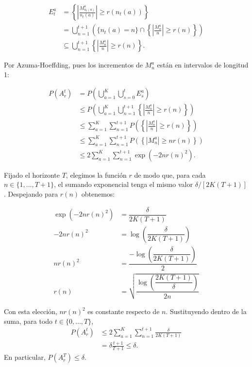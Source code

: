 \begin{align*}
E_t^a &=\left\{\left|\frac{M^a_{n_t(a)}}{n_t(a)}\right|\ge r(n_t(a))\right\}\\
     &= \bigcup_{n=1}^{t+1}\left(\{n_t(a)=n\}\cap\left\{\left|\frac{M_n^a}{n}\right|\ge r(n)\right\}\right)\\
     &\subseteq\bigcup_{n=1}^{t+1}\left\{\left|\frac{M_n^a}{n}\right|\ge r(n)\right\}.
\end{align*}

Por Azuma-Hoeffding, pues los incrementos de \(M_n^a\) están en intervalos de longitud 1:

\begin{align}
    P(A_r^t) &= P\left(\bigcup^K_{a=1}\bigcup^t_{s=0} E^a_s\right) \nonumber \\
             &\leq P\left( \bigcup^K_{a=1}\bigcup^{t+1}_{n=1} \left\{\left|\frac{M_n^a}{n}\right|\ge r(n)\right\}\right) \nonumber \\
             & \leq \sum^K_{a=1} \sum^{t+1}_{n=1} P\left( \left\{\left|\frac{M_n^a}{n}\right|\ge r(n)\right\}\right) \nonumber\\
             & \leq \sum^K_{a=1} \sum^{t+1}_{n=1} P\left( \left\{\left|M_n^a\right|\ge nr(n)\right\}\right) \nonumber\\
                &\leq 2\sum^K_{a=1}\sum^{t+1}_{n=1}\operatorname{exp}(-2nr(n)^2).
\end{align}

Fijado el horizonte \(T\), elegimos la función \(r\) de modo que, para cada \(n\in\{1,\ldots,T+1\}\), el sumando exponencial tenga el mismo valor \(\delta/[2K(T+1)]\). Despejando para \(r(n)\) obtenemos:

\begin{align}
    \operatorname{exp}(-2nr(n)^2) &= \dfrac{\delta}{2K(T+1)}  \nonumber \\
    -2nr(n)^2  &= \operatorname{log}\left(\dfrac{\delta}{2K(T+1)}\right) \nonumber \\
    nr(n)^2 &=  \dfrac{-\operatorname{log}\left(\dfrac{\delta}{2K(T+1)}\right)}{2} \nonumber \\
    r(n) &=  \sqrt{\dfrac{\operatorname{log}\left(\dfrac{2K(T+1)}{\delta}\right)}{2n}} \label{eq:uppercb}
\end{align}

Con esta elección, \(nr(n)^2\) es constante respecto de \(n\). Sustituyendo dentro de la suma, para todo \(t\in\{0,\ldots,T\}\),
\begin{align*}
    P(A_r^t)
    &\leq 2\sum_{a=1}^K\sum_{n=1}^{t+1}\frac{\delta}{2K(T+1)}\\
    &=\delta\frac{t+1}{T+1}\leq\delta.
\end{align*}
En particular, \(P(A_r^T)\leq\delta\).

